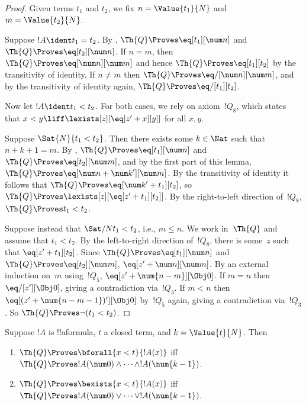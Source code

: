 \documentclass[../../../include/open-logic-section]{subfiles}
\begin{document}
\begin{proof}
Given terms $t_1$ and $t_2$, we fix $n = \Value{t_1}{N}$ and
$m = \Value{t_2}{N}$.

Suppose $!A \ident t_1 = t_2$. By ,
$\Th{Q} \Proves \eq[t_1][\num n]$ and $\Th{Q} \Proves \eq[t_2][\num n]$.
If $n = m$, then $\Th{Q} \Proves \eq[\num n][\num m]$ and hence
$\Th{Q} \Proves \eq[t_1][t_2]$ by the transitivity of identity.
If $n \neq m$ then $\Th{Q} \Proves \eq/[\num n][\num m]$,
and by the transitivity of identity again,
$\Th{Q} \Proves \eq/[t_1][t_2]$.

Now let $!A \ident t_1 < t_2$. For both cases, we rely on axiom~$!Q_8$,
which states that $x < y \liff \lexists[z][\eq[z' + x][y]]$
for all $x,y$.

Suppose $\Sat{N}{t_1 < t_2}$. Then there exists some $k \in \Nat$
such that $n + k + 1 = m$. By ,
$\Th{Q} \Proves \eq[t_1][\num n]$ and $\Th{Q} \Proves \eq[t_2][\num m]$,
and by the first part of this lemma,
$\Th{Q} \Proves \eq[\num n + {\num k}'][\num m]$.
By the transitivity of identity it follows that
$\Th{Q} \Proves \eq[{\num k}' + t_1][t_2]$,
so $\Th{Q} \Proves \lexists[z][\eq[z' + t_1][t_2]]$.
By the right-to-left direction of~$!Q_8$, $\Th{Q} \Proves t_1 < t_2$.

Suppose instead that $\Sat/{N}{t_1 < t_2}$, i.e., $m \leq n$.
%
We work in~$\Th{Q}$ and assume that $t_1 < t_2$. By the left-to-right
direction of~$!Q_8$, there is some~$z$ such that $\eq[z' + t_1][t_2]$.
Since $\Th{Q} \Proves \eq[t_1][\num n]$ and
$\Th{Q} \Proves \eq[t_2][\num m]$, $\eq[z' + \num n][\num m]$.
%
By an external induction on~$m$ using~$!Q_5$,
$\eq[z' + \num{n - m}][\Obj 0]$.
If $m = n$ then $\eq/[z'][\Obj 0]$, giving a contradiction via~$!Q_3$.
If $m < n$ then $\eq[(z' + \num{n - m - 1})'][\Obj 0]$ by~$!Q_5$ again,
giving a contradiction via~$!Q_3$.
So $\Th{Q} \Proves \lnot(t_1 < t_2)$.
\end{proof}

\begin{lem}
Suppose $!A$ is !!a{formula}, $t$ a closed term, and $k=\Value{t}{N}$. Then
\begin{enumerate}
\item $\Th{Q} \Proves \bforall{x<t}{!A(x)}$ iff $\Th{Q} \Proves
    !A(\num 0) \land \dots \land !A(\num{k-1})$.
\item $\Th{Q} \Proves \bexists{x<t}{!A(x)}$ iff $\Th{Q} \Proves
    !A(\num 0) \lor \dots \lor !A(\num{k-1})$.
\end{enumerate}
\end{lem}
\end{document}
